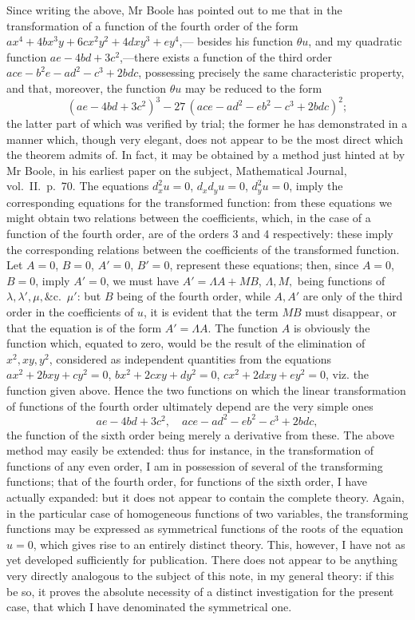 \documentclass[11pt]{article}
\begin{document}
Since writing the above, Mr Boole has pointed out to me that in the transformation
of a function of the fourth order of the form $a x^4 + 4 b x^3 y + 6 c x^2 y^2 + 4 d x y^3 + e y^4$,---
besides his function $\theta u$, and my quadratic function $ae - 4 b d + 3 c^2$,---there exists a function
of the third order $ace - b^2 e - a d^2 - c^3 + 2 b d c$, possessing precisely the same characteristic
property, and that, moreover, the function $\theta u$ may be reduced to the form
\[
(ae - 4bd + 3c^2)^3 - 27\,(ace - ad^2 - eb^2 - c^3 + 2bdc)^2;
\]
the latter part of which was verified by trial; the former he has demonstrated in a
manner which, though very elegant, does not appear to be the most direct which the
theorem admits of. In fact, it may be obtained by a method just hinted at by
Mr Boole, in his earliest paper on the subject, Mathematical Journal, vol.~II.~p.~70.
The equations $d_x^2 u = 0$, $d_x d_y u = 0$, $d_y^2 u = 0$, imply the corresponding equations for the
transformed function: from these equations we might obtain two relations between the
coefficients, which, in the case of a function of the fourth order, are of the orders 3
and 4 respectively: these imply the corresponding relations between the coefficients of
the transformed function. Let $A=0$, $B=0$, $A'=0$, $B'=0$, represent these equations;
then, since $A=0$, $B=0$, imply $A'=0$, we must have $A' = \Lambda A + M B$, $\Lambda, M,$ being
functions of $\lambda, \lambda', \mu, $\&c.~$\mu'$: but $B$ being of the fourth order, while $A, A'$ are only of
the third order in the coefficients of $u$, it is evident that the term $MB$ must disappear,
or that the equation is of the form $A' = \Lambda A$. The function $A$ is obviously the function
which, equated to zero, would be the result of the elimination of $x^2, xy, y^2$, considered
as independent quantities from the equations $a x^2 + 2 b x y + c y^2 = 0$, $b x^2 + 2 c x y + d y^2 = 0$,
$c x^2 + 2 d x y + e y^2 = 0$, viz. the function given above. Hence the two functions on which
the linear transformation of functions of the fourth order ultimately depend are the
very simple ones
\[
ae - 4bd + 3c^2,\quad ace - ad^2 - eb^2 - c^3 + 2bdc,
\]
the function of the sixth order being merely a derivative from these. The above
method may easily be extended: thus for instance, in the transformation of functions of
any even order, I am in possession of several of the transforming functions; that of the
fourth order, for functions of the sixth order, I have actually expanded: but it does not
appear to contain the complete theory. Again, in the particular case of homogeneous
functions of two variables, the transforming functions may be expressed as symmetrical
functions of the roots of the equation $u = 0$, which gives rise to an entirely distinct
theory. This, however, I have not as yet developed sufficiently for publication. There
does not appear to be anything very directly analogous to the subject of this note, in
my general theory: if this be so, it proves the absolute necessity of a distinct investigation
for the present case, that which I have denominated the symmetrical one.
\end{document}
